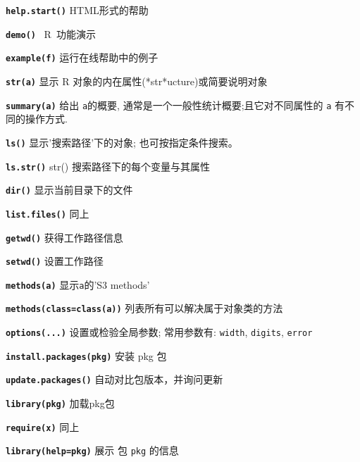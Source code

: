 \documentclass[landscape]{article}
\newcommand{\code}{\texttt}
\newcommand{\bcode}[1]{\texttt{\textbf{#1}}}
\begin{document}
\begin{multicols*}{3}
\bcode{help.start()} HTML形式的帮助

\bcode{demo()}    ~R~功能演示

\bcode{example(f)}  运行在线帮助中的例子

\bcode{str(a)} 显示 R 对象的内在属性(*str*ucture)或简要说明对象

\bcode{summary(a)} 给出 \code{a}的概要, 通常是一个一般性统计概要;且它对不同属性的 \code{a} 有不同的操作方式.

\bcode{ls()} 显示'搜索路径'下的对象; 也可按指定条件搜索。

\bcode{ls.str()} str() 搜索路径下的每个变量与其属性

\bcode{dir()} 显示当前目录下的文件

\bcode{list.files()}    同上

\bcode{getwd()} 获得工作路径信息

\bcode{setwd()} 设置工作路径

\bcode{methods(a)}  显示\code{a}的'S3 methods'

\bcode{methods(class=class(a))} 列表所有可以解决属于对象类的方法

\bcode{options(...)} 设置或检验全局参数; 常用参数有:
\code{width}, \code{digits}, \code{error}

\bcode{install.packages(pkg)} 安装 pkg 包

\bcode{update.packages()} 自动对比包版本，并询问更新

\bcode{library(pkg)} 加载pkg包

\bcode{require(x)}  同上

\bcode{library(help=pkg)} 展示
包  \code{pkg} 的信息


\end{multicols*}
\end{document}
